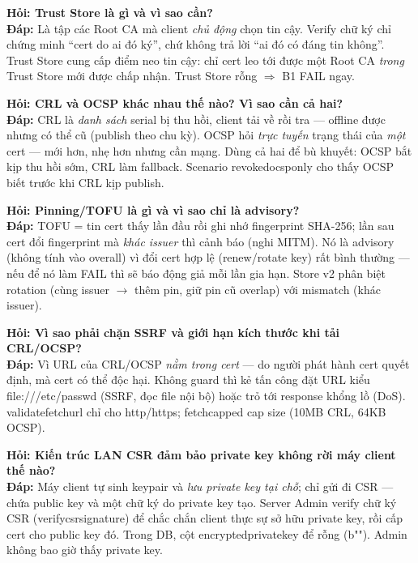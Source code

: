 \documentclass[12pt,a4paper]{article}
\newcommand{\code}[1]{{\ttfamily\small\def\_{\textunderscore\discretionary{}{}{}}#1}}
\begin{document}
\begin{qabox}
\textbf{Hỏi: Trust Store là gì và vì sao cần?}\\
\textbf{Đáp:} Là tập các Root CA mà client \emph{chủ động} chọn tin cậy. Verify
chữ ký chỉ chứng minh ``cert do ai đó ký'', chứ không trả lời ``ai đó có đáng tin
không''. Trust Store cung cấp điểm neo tin cậy: chỉ cert leo tới được một Root CA
\emph{trong} Trust Store mới được chấp nhận. Trust Store rỗng $\Rightarrow$ B1
FAIL ngay.
\end{qabox}

\begin{qabox}
\textbf{Hỏi: CRL và OCSP khác nhau thế nào? Vì sao cần cả hai?}\\
\textbf{Đáp:} CRL là \emph{danh sách} serial bị thu hồi, client tải về rồi tra
--- offline được nhưng có thể cũ (publish theo chu kỳ). OCSP hỏi \emph{trực
tuyến} trạng thái của \emph{một} cert --- mới hơn, nhẹ hơn nhưng cần mạng. Dùng cả
hai để bù khuyết: OCSP bắt kịp thu hồi sớm, CRL làm fallback. Scenario
\code{revoked\_ocsp\_only} cho thấy OCSP biết trước khi CRL kịp publish.
\end{qabox}

\begin{qabox}
\textbf{Hỏi: Pinning/TOFU là gì và vì sao chỉ là advisory?}\\
\textbf{Đáp:} TOFU = tin cert thấy lần đầu rồi ghi nhớ fingerprint SHA-256; lần
sau cert đổi fingerprint mà \emph{khác issuer} thì cảnh báo (nghi MITM). Nó là
advisory (không tính vào \code{overall}) vì đổi cert hợp lệ (renew/rotate key) rất
bình thường --- nếu để nó làm FAIL thì sẽ báo động giả mỗi lần gia hạn. Store v2
phân biệt rotation (cùng issuer $\to$ thêm pin, giữ pin cũ overlap) với mismatch
(khác issuer).
\end{qabox}

\begin{qabox}
\textbf{Hỏi: Vì sao phải chặn SSRF và giới hạn kích thước khi tải CRL/OCSP?}\\
\textbf{Đáp:} Vì URL của CRL/OCSP \emph{nằm trong cert} --- do người phát hành
cert quyết định, mà cert có thể độc hại. Không guard thì kẻ tấn công đặt URL kiểu
\code{file:///etc/passwd} (SSRF, đọc file nội bộ) hoặc trỏ tới response khổng lồ
(DoS). \code{\_validate\_fetch\_url} chỉ cho \code{http/https}; \code{\_fetch\_capped}
cap size (10MB CRL, 64KB OCSP).
\end{qabox}

\begin{qabox}
\textbf{Hỏi: Kiến trúc LAN CSR đảm bảo private key không rời máy client thế nào?}\\
\textbf{Đáp:} Máy client tự sinh keypair và \emph{lưu private key tại chỗ}; chỉ
gửi đi CSR --- chứa public key và một chữ ký do private key tạo. Server Admin
verify chữ ký CSR (\code{verify\_csr\_signature}) để chắc chắn client thực sự sở
hữu private key, rồi cấp cert cho public key đó. Trong DB, cột
\code{encrypted\_private\_key} để rỗng (\code{b""}). Admin không bao giờ thấy
private key.
\end{qabox}
\end{document}
